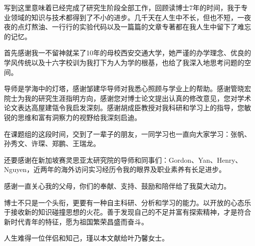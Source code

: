 


写到这里意味着已经完成了研究生阶段全部工作，回顾读博士7年的时间，我于专业领域的知识与技术都得到了不小的进步。几千天在人生中不长，但也不短，一夜夜的点灯熬油、一行行的实验代码以及一篇篇的文章专著都在我人生中留下了难忘的记忆。


首先感谢我一不留神就呆了10年的母校西安交通大学，她严谨的办学理念、优良的学风传统以及十六字校训为我打下为人为学的根基，也给了我深入地思考问题的空间。

导师是学海中的灯塔，感谢邹建华导师对我悉心照顾与学业上的帮助。感谢管晓宏院士为我的研究生涯指明方向，感谢您对博士论文提出认真的修改意见，您对学术论文表达高屋建瓴令我启发深刻。感谢胡成臣教授对我科研和学习上的指导，您敏锐的思维和富有洞察力的视野给我深刻启迪。

在课题组的这段时间，交到了一辈子的朋友，一同学习也一直向大家学习：张帆、孙秀文、许琛、郑鹏、王瑞龙。

还要感谢在新加坡赛灵思亚太研究院的导师和同事们：Gordon、Yan、Henry、Nguyen，近两年的海外访问实习经历令我的眼界及职业素养有长足进步。

感谢一直关心我的父母，你们的奉献、支持、鼓励和陪伴给了我莫大动力。

博士不只是一个头衔，更要有一种自主科研、分析和学习的能力。以开放的心态乐于接收新的知识碰撞思想的火花。善于发现自己的不足并富有探索精神，才是符合新时代青年的特征，愿为祖国繁荣昌盛而奋斗。

人生难得一位伴侣和知己，瑾以本文献给叶乃馨女士。

